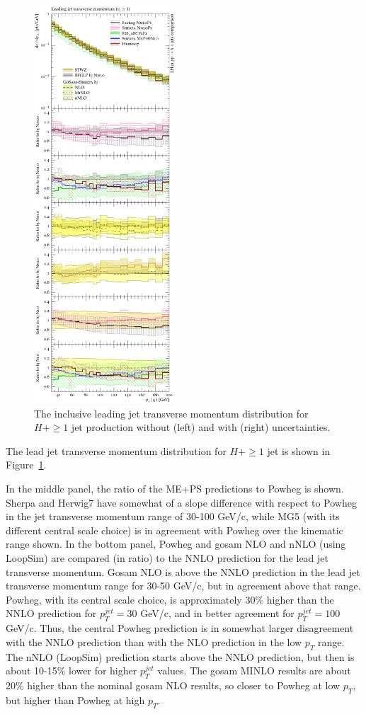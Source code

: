 \begin{figure}[t!]
  \includegraphics[width=0.47\textwidth]{figures/hjetscomp_jet1_pT_incl.pdf}
  \caption{
    The inclusive leading jet transverse momentum distribution for
    $H+\ge1$ jet production without (left) and with (right) uncertainties.
    \label{fig:higgscomp:results:1obs:j1pt}
  }
\end{figure}

The lead jet transverse momentum distribution for $H+\ge1$ jet is
shown in Figure~\ref{fig:higgscomp:results:1obs:j1pt}.

In the middle panel, the ratio of the ME+PS predictions to Powheg is
shown. Sherpa and Herwig7 have somewhat of a slope difference with
respect to Powheg in the jet transverse momentum range of 30-100
GeV/c, while MG5 (with its different central scale choice) is in
agreement with Powheg over the kinematic range shown.  In the bottom
panel, Powheg and gosam NLO and nNLO (using LoopSim) are compared (in
ratio) to the NNLO prediction for the lead jet transverse
momentum. Gosam NLO is above the NNLO prediction in the lead jet
transverse momentum range for 30-50 GeV/c, but in agreement above that
range. Powheg, with its central scale choice, is approximately 30\%
higher than the NNLO prediction for $p_T^{jet}=30$ GeV/c, and in
better agreement for $p_T^{jet}=100$ GeV/c. Thus, the central Powheg
prediction is in somewhat larger disagreement with the NNLO prediction
than with the NLO prediction in the low $p_T$ range. The nNLO
(LoopSim) prediction starts above the NNLO prediction, but then is
about 10-15\% lower for higher $p_T^{jet}$ values. The gosam MINLO
results are about 20\% higher than the nominal gosam NLO results, so
closer to Powheg at low $p_T$, but higher than Powheg at high $p_T$.

